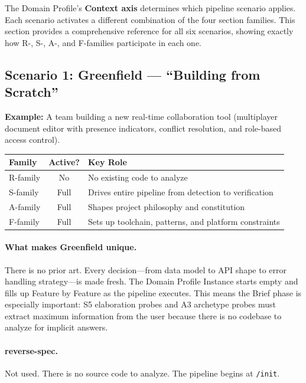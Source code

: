 \documentclass[11pt,a4paper,openright,twoside]{report}
\newcommand{\cmd}[1]{\texttt{/#1}}
\begin{document}
The Domain Profile's \textbf{Context axis} determines which pipeline scenario applies. Each scenario activates a different combination of the four section families. This section provides a comprehensive reference for all six scenarios, showing exactly how R-, S-, A-, and F-families participate in each one.

\subsection{Scenario 1: Greenfield --- ``Building from Scratch''}
\label{sec:scenario-greenfield}

\textbf{Example:} A team building a new real-time collaboration tool (multiplayer document editor with presence indicators, conflict resolution, and role-based access control).

\begin{center}
\begin{tabular}{lcp{8cm}}
\toprule
\textbf{Family} & \textbf{Active?} & \textbf{Key Role} \\
\midrule
R-family & No & No existing code to analyze \\
S-family & Full & Drives entire pipeline from detection to verification \\
A-family & Full & Shapes project philosophy and constitution \\
F-family & Full & Sets up toolchain, patterns, and platform constraints \\
\bottomrule
\end{tabular}
\end{center}

\paragraph{What makes Greenfield unique.}
There is no prior art. Every decision---from data model to API shape to error handling strategy---is made fresh. The Domain Profile Instance starts empty and fills up Feature by Feature as the pipeline executes. This means the Brief phase is especially important: S5 elaboration probes and A3 archetype probes must extract maximum information from the user because there is no codebase to analyze for implicit answers.

\paragraph{reverse-spec.}
Not used. There is no source code to analyze. The pipeline begins at \cmd{init}.
\end{document}
